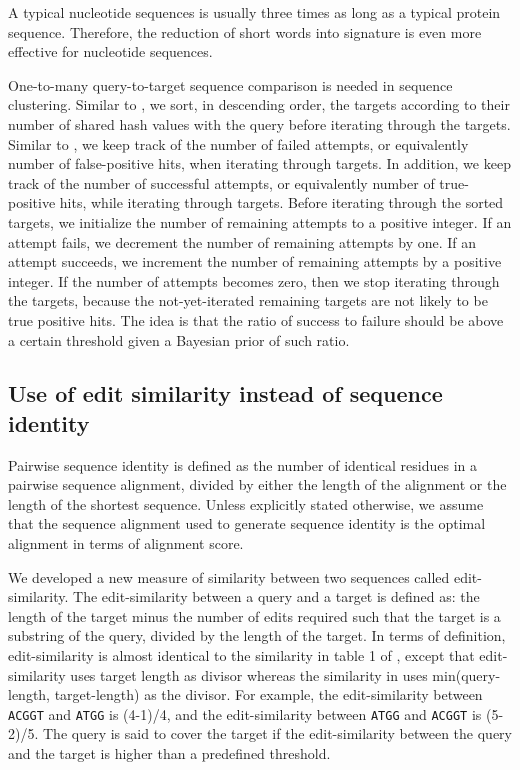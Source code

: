 \documentclass[]{article}
\begin{document}
A typical nucleotide sequences is usually three times as long as a typical protein sequence.
Therefore, the reduction of short words into signature is even more effective for nucleotide sequences.

One-to-many query-to-target sequence comparison is needed in sequence clustering. 
Similar to \cite{li2006cd}, we sort, in descending order, the targets according to their number of shared hash values with the query before iterating through the targets. 
Similar to \cite{edgar2010search}, we keep track of the number of failed attempts, or equivalently number of false-positive hits, when iterating through targets.
In addition, we keep track of the number of successful attempts, or equivalently number of true-positive hits, while iterating through targets.
Before iterating through the sorted targets, we initialize the number of remaining attempts to a positive integer.
If an attempt fails, we decrement the number of remaining attempts by one.
If an attempt succeeds, we increment the number of remaining attempts by a positive integer.
If the number of attempts becomes zero, then we stop iterating through the targets, because the not-yet-iterated remaining targets are not likely to be true positive hits.
The idea is that the ratio of success to failure should be above a certain threshold given a Bayesian prior of such ratio.

\subsection{Use of edit similarity instead of sequence identity}

Pairwise sequence identity is defined as the number of identical residues in a pairwise sequence alignment, divided by either the length of the alignment or the length of the shortest sequence. 
Unless explicitly stated otherwise, we assume that the sequence alignment used to generate sequence identity is the optimal alignment in terms of alignment score.

We developed a new measure of similarity between two sequences called edit-similarity.
The edit-similarity between a query and a target is defined as: the length of the target minus the number of edits required such that the target is a substring of the query, divided by the length of the target.
In terms of definition, edit-similarity is almost identical to the similarity in table 1 of \cite{vsovsic2017edlib}, 
	except that edit-similarity uses target length as divisor whereas the similarity in \cite{vsovsic2017edlib} uses min(query-length, target-length) as the divisor. 
For example, the edit-similarity between \texttt{ACGGT} and \texttt{ATGG} is (4-1)/4, and the edit-similarity between \texttt{ATGG} and \texttt{ACGGT} is (5-2)/5.
The query is said to cover the target if the edit-similarity between the query and the target is higher than a predefined threshold.
\end{document}
